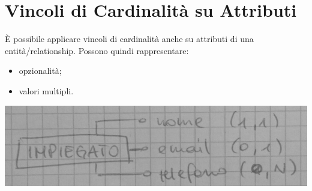 \section{Vincoli di Cardinalità su Attributi}
È possibile applicare vincoli di cardinalità anche su attributi di una entità/relationship. Possono quindi rappresentare:
\begin{itemize}
    \item opzionalità;
    \item valori multipli.
\end{itemize}
\begin{center}
    \includegraphics[width=.7\textwidth]{res/er-cardinalita-attrs.jpg} \hfill
\end{center}

